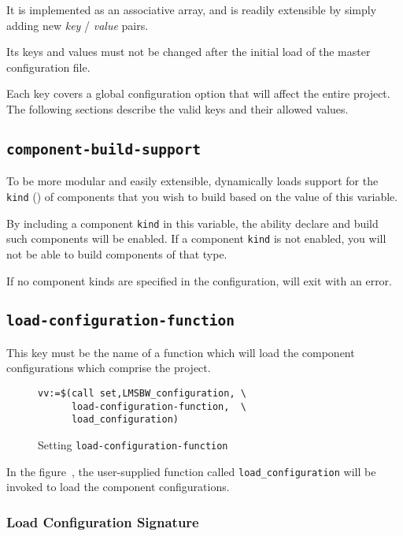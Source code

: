It is implemented as an associative array, and is readily extensible
by simply adding new \emph{key} / \emph{value} pairs.

Its keys and values must not be changed after the initial load of the
master configuration file.

Each key covers a global configuration option that will affect the
entire project.  The following sections describe the valid keys and
their allowed values.


\subsection{\texttt{component-build-support}}\label{variables:component-build-support}

To be more modular and easily extensible, \lmsbw dynamically loads
support for the \texttt{kind} () of components
that you wish to build based on the value of this variable.

By including a component \texttt{kind} in this variable, the ability
declare and build such components will be enabled.  If a component
\texttt{kind} is not enabled, you will not be able to build components
of that type.

If no component kinds are specified in the configuration, \lmsbw will
exit with an error.

\subsection{\texttt{load-configuration-function}}\label{variables:load-configuration-function}

This key must be the name of a \gnumake function which will load the
component configurations which comprise the project.

\begin{figure}
\hrulefill
\begin{verbatim}
vv:=$(call set,LMSBW_configuration, \
      load-configuration-function,  \
      load_configuration)
\end{verbatim}
\hrulefill
\caption{Setting \texttt{load-configuration-function}}\label{variables:set-load-configuration}
\end{figure}

In the figure~, the
user-supplied function called \texttt{load\_configuration} will be
invoked to load the component configurations.

\subsubsection{Load Configuration Signature}

